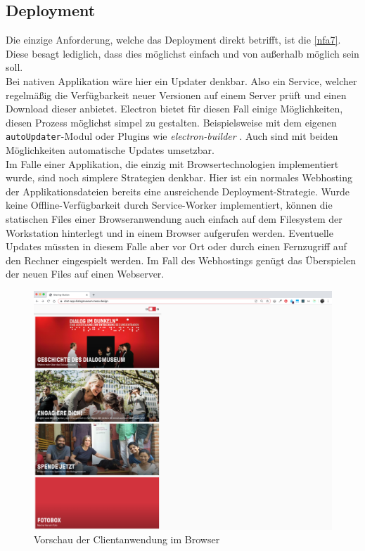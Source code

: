 \subsection{Deployment}
\label{subs:deployment}

Die einzige Anforderung, welche das Deployment direkt betrifft, ist die 
\ref{nfa7}. Diese besagt lediglich, dass dies möglichst einfach und von außerhalb möglich
sein soll.\\
Bei nativen Applikation wäre hier ein Updater denkbar. Also ein Service,
welcher regelmäßig die Verfügbarkeit neuer Versionen auf einem Server prüft und einen Download 
dieser anbietet. Electron bietet für diesen Fall einige Möglichkeiten, diesen Prozess 
möglichst simpel zu gestalten. Beispielsweise mit dem eigenen 
\texttt{autoUpdater}-Modul \cite{electron-autoUpdater} oder Plugins wie 
\emph{electron-builder} \cite{electron-builder}. Auch sind mit beiden Möglichkeiten
automatische Updates umsetzbar.\\
Im Falle einer Applikation, die einzig mit Browsertechnologien implementiert wurde, sind 
noch simplere Strategien denkbar. Hier ist ein normales Webhosting der Applikationsdateien 
bereits eine ausreichende Deployment-Strategie. Wurde keine Offline-Verfügbarkeit durch
Service-Worker implementiert, können die statischen Files einer Browseranwendung
auch einfach auf dem Filesystem der Workstation hinterlegt und in einem Browser aufgerufen 
werden. Eventuelle Updates müssten in diesem Falle aber vor Ort oder durch einen
Fernzugriff auf den Rechner eingespielt werden. Im Fall des Webhostings genügt das Überspielen
der neuen Files auf einen Webserver.\\

\begin{figure}
    \centering
    \includegraphics[width=1\textwidth]{figures/images/browser-preview.png}
    \caption{Vorschau der \shst{} Clientanwendung im Browser}
    \label{fig:browser-preview}
\end{figure}

